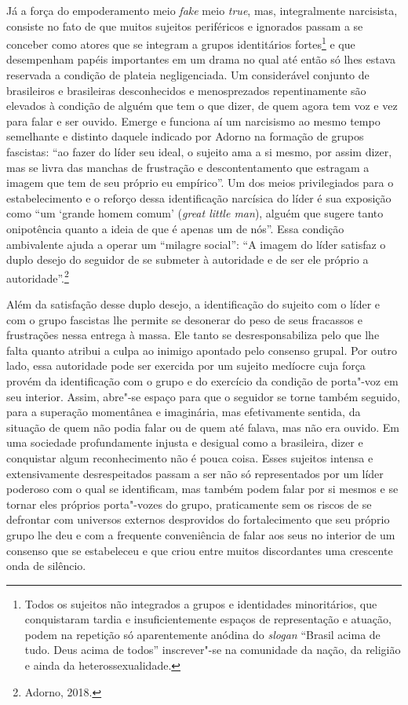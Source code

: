 Já a força do empoderamento meio \emph{fake} meio \emph{true}, mas,
integralmente narcisista, consiste no fato de que muitos sujeitos
periféricos e ignorados passam a se conceber como atores que se integram
a grupos identitários fortes\footnote{Todos os sujeitos não integrados a
  grupos e identidades minoritários, que conquistaram tardia e
  insuficientemente espaços de representação e atuação, podem na
  repetição só aparentemente anódina do \emph{slogan} ``Brasil acima de
  tudo. Deus acima de todos'' inscrever"-se na comunidade da nação, da
  religião e ainda da heterossexualidade.} e que desempenham papéis
importantes em um drama no qual até então só lhes estava reservada a
condição de plateia negligenciada. Um considerável conjunto de
brasileiros e brasileiras desconhecidos e menosprezados repentinamente
são elevados à condição de alguém que tem o que dizer, de quem agora tem
voz e vez para falar e ser ouvido. Emerge e funciona aí um narcisismo ao
mesmo tempo semelhante e distinto daquele indicado por Adorno na
formação de grupos fascistas: ``ao fazer do líder seu ideal, o sujeito
ama a si mesmo, por assim dizer, mas se livra das manchas de frustração
e descontentamento que estragam a imagem que tem de seu próprio eu
empírico''. Um dos meios privilegiados para o estabelecimento e o
reforço dessa identificação narcísica do líder é sua exposição como ``um
`grande homem comum' (\emph{great little man}), alguém que sugere tanto
onipotência quanto a ideia de que é apenas um de nós''. Essa condição
ambivalente ajuda a operar um ``milagre social'': ``A imagem do líder
satisfaz o duplo desejo do seguidor de se submeter à autoridade e de ser
ele próprio a autoridade''.\footnote{Adorno, 2018.}

Além da satisfação desse duplo desejo, a identificação do sujeito com o
líder e com o grupo fascistas lhe permite se desonerar do peso de seus
fracassos e frustrações nessa entrega à massa. Ele tanto se
desresponsabiliza pelo que lhe falta quanto atribui a culpa ao inimigo
apontado pelo consenso grupal. Por outro lado, essa autoridade pode ser
exercida por um sujeito medíocre cuja força provém da identificação com
o grupo e do exercício da condição de porta"-voz em seu interior. Assim,
abre"-se espaço para que o seguidor se torne também seguido, para a
superação momentânea e imaginária, mas efetivamente sentida, da situação
de quem não podia falar ou de quem até falava, mas não era ouvido. Em
uma sociedade profundamente injusta e desigual como a brasileira, dizer
e conquistar algum reconhecimento não é pouca coisa. Esses sujeitos
intensa e extensivamente desrespeitados passam a ser não só
representados por um líder poderoso com o qual se identificam, mas
também podem falar por si mesmos e se tornar eles próprios porta"-vozes
do grupo, praticamente sem os riscos de se defrontar com universos
externos desprovidos do fortalecimento que seu próprio grupo lhe deu e
com a frequente conveniência de falar aos seus no interior de um
consenso que se estabeleceu e que criou entre muitos discordantes uma
crescente onda de silêncio.

